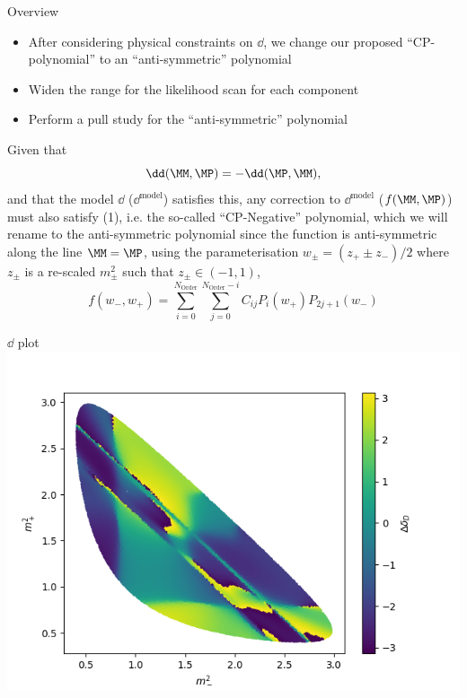 \begin{frame}{Overview}
    \begin{itemize}
        \item After considering physical constraints on $\dd$, we change our proposed ``CP-polynomial'' to an ``anti-symmetric'' polynomial
        \item Widen the range for the likelihood scan for each component
        \item Perform a pull study for the ``anti-symmetric'' polynomial
    \end{itemize}
\end{frame}
\begin{frame}
    Given that 
    \begin{equation}
        \dd(\MM,\MP) = -\dd(\MP,\MM),
    \end{equation}
    and that the model $\dd$ ($\dd^\text{model}$) satisfies this, any correction to $\dd^\text{model}$ ($f(\MM,\MP)$) must also satisfy (1), i.e. the so-called ``CP-Negative'' polynomial, which we will rename to the anti-symmetric polynomial since the function is anti-symmetric along the line $\MM=\MP$, using the parameterisation $w_\pm = (z_+ \pm z_-)/2$ where $z_\pm$ is a re-scaled $m^2_\pm$ such that $z_\pm \in (-1,1)$,
    \begin{equation}
        f(w_-,w_+) = \sum_{i=0}^{N_\text{Order}} \sum_{j=0}^{N_\text{Order} - i} C_{ij} P_{i}(w_+) P_{2j+1}(w_-)
    \end{equation}
\end{frame}

\begin{frame}{$\dd$ plot}
\includegraphics[width=\textwidth]{2020_04_28/figs/dd.png}
\end{frame}

